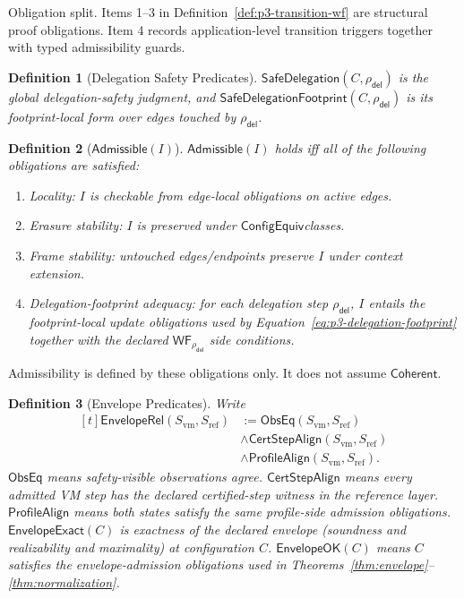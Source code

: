 \documentclass[a4paper,10pt,twocolumn,english]{article}
\numberwithin{equation}{section}
\theoremstyle{paperdef}
\newtheorem{definition}{Definition}[section]
\theoremstyle{paperplain}
\theoremstyle{paperdef}
\theoremstyle{paperremark}
\theoremstyle{paperdef}
\newcommand{\Coherent}{\ensuremath{\mathsf{Coherent}}}
\newcommand{\Admissible}{\ensuremath{\mathsf{Admissible}}}
\newcommand{\EnvelopeRel}{\ensuremath{\mathsf{EnvelopeRel}}}
\newcommand{\EnvelopeExact}{\ensuremath{\mathsf{EnvelopeExact}}}
\newcommand{\EnvelopeOK}{\ensuremath{\mathsf{EnvelopeOK}}}
\newcommand{\ConfigEquiv}{\ensuremath{\mathsf{ConfigEquiv}}}
\begin{document}
Obligation split. Items 1--3 in Definition~\ref{def:p3-transition-wf} are
structural proof obligations. Item 4 records application-level transition
triggers together with typed admissibility guards.

\begin{definition}[Delegation Safety Predicates]
	$\mathsf{SafeDelegation}(C,\rho_{\mathsf{del}})$ is the global delegation-safety judgment, and
	$\mathsf{SafeDelegationFootprint}(C,\rho_{\mathsf{del}})$ is its footprint-local form over edges touched by $\rho_{\mathsf{del}}$.
\end{definition}

\begin{definition}[$\Admissible(I)$]
	$\Admissible(I)$ holds iff all of the following obligations are satisfied:
	\begin{enumerate}
		\item Locality: $I$ is checkable from edge-local obligations on active edges.
		\item Erasure stability: $I$ is preserved under \ConfigEquiv classes.
		\item Frame stability: untouched edges/endpoints preserve $I$ under context extension.
		\item Delegation-footprint adequacy: for each delegation step $\rho_{\mathsf{del}}$, $I$ entails the footprint-local update obligations used by Equation~\ref{eq:p3-delegation-footprint} together with the declared $\mathsf{WF}_{\rho_{\mathsf{del}}}$ side conditions.
	\end{enumerate}
\end{definition}

Admissibility is defined by these obligations only. It does not assume \Coherent.

\begin{definition}[Envelope Predicates]
	Write
	\[
		\begin{aligned}[t]
			\EnvelopeRel(S_{\mathrm{vm}}, S_{\mathrm{ref}})
			 & := \mathsf{ObsEq}(S_{\mathrm{vm}}, S_{\mathrm{ref}})            \\
			 & \land \mathsf{CertStepAlign}(S_{\mathrm{vm}}, S_{\mathrm{ref}}) \\
			 & \land \mathsf{ProfileAlign}(S_{\mathrm{vm}}, S_{\mathrm{ref}}).
		\end{aligned}
	\]
	$\mathsf{ObsEq}$ means safety-visible observations agree.
	$\mathsf{CertStepAlign}$ means every admitted VM step has the declared certified-step witness in the reference layer.
	$\mathsf{ProfileAlign}$ means both states satisfy the same profile-side admission obligations.
	$\EnvelopeExact(C)$ is exactness of the declared envelope (soundness and
	realizability and maximality) at configuration $C$. $\EnvelopeOK(C)$ means $C$ satisfies
	the envelope-admission obligations used in Theorems~\ref{thm:envelope}--\ref{thm:normalization}.
\end{definition}
\end{document}
